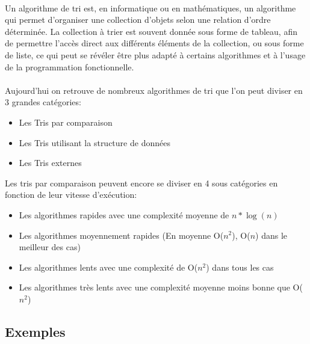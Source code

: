 \documentclass[11pt,a4paper]{article}
\begin{document}
\paragraph{}
Un algorithme de tri est, en informatique ou en mathématiques, un algorithme qui permet d'organiser une collection d'objets
selon une relation d'ordre déterminée.
\newline
La collection à trier est souvent donnée sous forme de tableau, afin de permettre l'accès direct aux différents éléments de la collection,
ou sous forme de liste, ce qui peut se révéler être plus adapté à certains algorithmes et à l'usage de la programmation fonctionnelle.\\

\paragraph{}
Aujourd'hui on retrouve de nombreux algorithmes de tri que l'on peut diviser en 3 grandes catégories:
\begin{itemize}
    \item Les Tris par comparaison
    \item Les Tris utilisant la structure de données
    \item Les Tris externes
\end{itemize}
\vspace{0.5cm}
Les tris par comparaison peuvent encore se diviser en 4 sous catégories en fonction de leur vitesse d'exécution:

\vspace{0.2cm}
\begin{itemize}
    \item Les algorithmes rapides avec une complexité moyenne de $n*\log(n)$
    \item Les algorithmes moyennement rapides (En moyenne O($n^2$), O($n$) dans le meilleur des cas)
    \item Les algorithmes lents avec une complexité de O($n^2$) dans tous les cas
    \item Les algorithmes très lents avec une complexité moyenne moins bonne que O($n^2$)
\end{itemize}

\subsection{Exemples}
\end{document}
